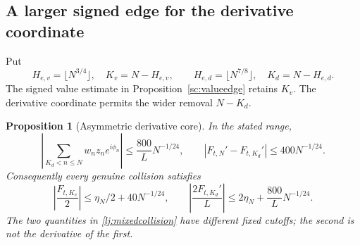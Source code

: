\documentclass[11pt]{article}
\numberwithin{equation}{section}
\newtheorem{proposition}[theorem]{Proposition}
\theoremstyle{definition}
\theoremstyle{remark}
\begin{document}
\subsection{A larger signed edge for the derivative coordinate}

Put
\[
 H_{e,v}=\lfloor N^{3/4}\rfloor,\quad K_v=N-H_{e,v},
 \qquad H_{e,d}=\lfloor N^{7/8}\rfloor,\quad K_d=N-H_{e,d}.
\]
The signed value estimate in Proposition~\ref{sc:valueedge} retains \(K_v\).
The derivative coordinate permits the wider removal \(N-K_d\).

\begin{proposition}[Asymmetric derivative core]\label{lj:derivativecore}
In the stated range,
\begin{equation}\label{lj:derivativetail}
 \left|\sum_{K_d<n\le N}w_nz_ne^{i\phi_n}\right|
       \le\frac{800}{L}N^{-1/24},\qquad
 |F_{t,N}'-F_{t,K_d}'|\le400N^{-1/24}.
\end{equation}
Consequently every genuine collision satisfies
\begin{equation}\label{lj:mixedcollision}
 \left|\frac{F_{t,K_v}}2\right|
       \le\eta_N/2+40N^{-1/24},\qquad
 \left|\frac{2F_{t,K_d}'}L\right|
       \le2\eta_N+\frac{800}{L}N^{-1/24}.
\end{equation}
The two quantities in \eqref{lj:mixedcollision} have different fixed
cutoffs; the second is not the derivative of the first.
\end{proposition}
\end{document}
